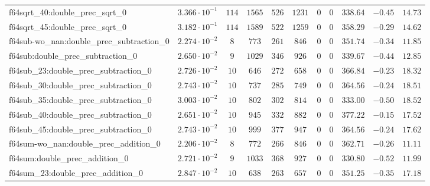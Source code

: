 \begin{tabular}{|l|c|c|c|c|c|c|c|c|c|c|}
f64sqrt\_40:double\_prec\_sqrt\_0              & $ 3.366 \cdot 10^{-1} $ & $ 114    $ & $ 1565   $ & $ 526   $ & $ 1231   $ & $ 0   $ & $ 0 $ & $ 338.64      $ & $ -0.45   $ & $ 14.73   $ \\
f64sqrt\_45:double\_prec\_sqrt\_0              & $ 3.182 \cdot 10^{-1} $ & $ 114    $ & $ 1589   $ & $ 522   $ & $ 1259   $ & $ 0   $ & $ 0 $ & $ 358.29      $ & $ -0.29   $ & $ 14.62   $ \\
f64sub-wo\_nan:double\_prec\_subtraction\_0    & $ 2.274 \cdot 10^{-2} $ & $ 8      $ & $ 773    $ & $ 261   $ & $ 846    $ & $ 0   $ & $ 0 $ & $ 351.74      $ & $ -0.34   $ & $ 11.85   $ \\
f64sub:double\_prec\_subtraction\_0            & $ 2.650 \cdot 10^{-2} $ & $ 9      $ & $ 1029   $ & $ 346   $ & $ 926    $ & $ 0   $ & $ 0 $ & $ 339.67      $ & $ -0.44   $ & $ 12.85   $ \\
f64sub\_23:double\_prec\_subtraction\_0        & $ 2.726 \cdot 10^{-2} $ & $ 10     $ & $ 646    $ & $ 272   $ & $ 658    $ & $ 0   $ & $ 0 $ & $ 366.84      $ & $ -0.23   $ & $ 18.32   $ \\
f64sub\_30:double\_prec\_subtraction\_0        & $ 2.743 \cdot 10^{-2} $ & $ 10     $ & $ 737    $ & $ 285   $ & $ 749    $ & $ 0   $ & $ 0 $ & $ 364.56      $ & $ -0.24   $ & $ 18.51   $ \\
f64sub\_35:double\_prec\_subtraction\_0        & $ 3.003 \cdot 10^{-2} $ & $ 10     $ & $ 802    $ & $ 302   $ & $ 814    $ & $ 0   $ & $ 0 $ & $ 333.00      $ & $ -0.50   $ & $ 18.52   $ \\
f64sub\_40:double\_prec\_subtraction\_0        & $ 2.651 \cdot 10^{-2} $ & $ 10     $ & $ 945    $ & $ 332   $ & $ 882    $ & $ 0   $ & $ 0 $ & $ 377.22      $ & $ -0.15   $ & $ 17.52   $ \\
f64sub\_45:double\_prec\_subtraction\_0        & $ 2.743 \cdot 10^{-2} $ & $ 10     $ & $ 999    $ & $ 377   $ & $ 947    $ & $ 0   $ & $ 0 $ & $ 364.56      $ & $ -0.24   $ & $ 17.62   $ \\
f64sum-wo\_nan:double\_prec\_addition\_0       & $ 2.206 \cdot 10^{-2} $ & $ 8      $ & $ 772    $ & $ 266   $ & $ 846    $ & $ 0   $ & $ 0 $ & $ 362.71      $ & $ -0.26   $ & $ 11.11   $ \\
f64sum:double\_prec\_addition\_0               & $ 2.721 \cdot 10^{-2} $ & $ 9      $ & $ 1033   $ & $ 368   $ & $ 927    $ & $ 0   $ & $ 0 $ & $ 330.80      $ & $ -0.52   $ & $ 11.99   $ \\
f64sum\_23:double\_prec\_addition\_0           & $ 2.847 \cdot 10^{-2} $ & $ 10     $ & $ 638    $ & $ 263   $ & $ 657    $ & $ 0   $ & $ 0 $ & $ 351.25      $ & $ -0.35   $ & $ 17.18   $ \\

\end{tabular}
